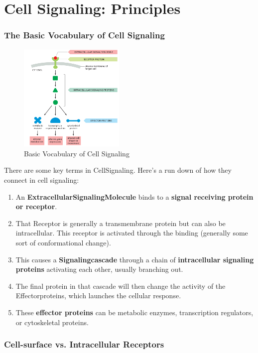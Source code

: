 \documentclass[../main.tex]{subfiles}
\begin{document}
	


\section{Cell Signaling: Principles}

\subsubsection{The Basic Vocabulary of Cell Signaling}

\begin{figure}[h]
	\centering
	\includegraphics[width=0.45\textwidth]{Basic_overview}
	\caption{Basic Vocabulary of Cell Signaling}
\end{figure}

There are some key terms in \gls{CellSignaling}. Here's a run down of how they connect in cell signaling:
\begin{enumerate}
	\item An \textbf{\gls{ExtracellularSignalingMolecule}} binds to a \textbf{signal receiving protein or receptor}.
	\item That \gls{Receptor} is generally a transmembrane protein but can also be intracellular. This receptor is activated through the binding (generally some sort of conformational change).
	\item This causes a \textbf{\gls{Signalingcascade}} through a chain of \textbf{intracellular signaling proteins} activating each other, usually branching out.
	\item The final protein in that cascade will then change the activity of the \gls{Effectorproteins}, which launches the cellular response.
	\item These \textbf{effector proteins} can be metabolic enzymes, transcription regulators, or cytoskeletal proteins.
\end{enumerate}

\subsubsection{Cell-surface vs. Intracellular Receptors}
\end{document}
